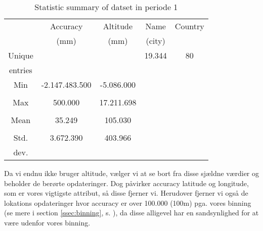 \begin{table}[H]
        \centering
        \small
        \setlength\tabcolsep{2pt}
        \begin{tabular}{|c|c|c|c|c|}
            \hline
                         & Accuracy           & Altitude    & Name   & Country  \\[-3pt]%
                         &  (mm)              & (mm)        & (city) &          \\
            \hline
                 Unique  &                    &             & 19.344 & 80        \\
                 entries &                    &             &        &           \\
            \hline
                 Min     &  -2.147.483.500    & -5.086.000  &        &           \\
                         &                    &             &        &           \\
            \hline
                 Max     &  500.000           & 17.211.698  &        &           \\
                         &                    &             &        &           \\
            \hline
                 Mean    & 35.249             & 105.030     &        &           \\
                         &                    &             &        &           \\
            \hline
                 Std.    & 3.672.390          & 403.966     &        &           \\
                 dev.    &                    &             &        &           \\
            \hline
        \end{tabular}
        \caption{Statistic summary of datset in periode 1} %
        \label{tab:stat_geo_p1}
\end{table}



Da vi endnu ikke bruger altitude, vælger vi at se bort fra disse sjældne værdier og beholder de berørte opdateringer. Dog påvirker accuracy latitude og longitude, som er vores vigtigste attribut, så disse fjerner vi. Herudover fjerner vi også de lokations opdateringer hvor accuracy er over 100.000 (100m) pga. vores binning (se mere i section \ref{ssec:binning}, s. \pageref{ssec:binning}), da disse alligevel har en sandsynlighed for at være udenfor vores binning. 

